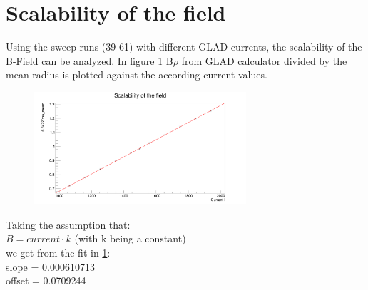 \documentclass[12pt, letterpaper]{article}
\begin{document}
\section{Scalability of the field}
Using the sweep runs (39-61) with different GLAD currents, the scalability of the B-Field can be analyzed. In figure \ref{fig:scalar} B\textunderscore$\rho$  from GLAD calculator divided by the mean radius is plotted against the according current values.\\ 
 \begin{figure}[!htb]
	\includegraphics[width=0.7\textwidth]{scalar.png}
	\caption{\label{fig:scalar}}
	\label{fig:scalar}
\end{figure}
Taking the assumption that:\\
$B = current \cdot k $ (with k being a constant)\\
we get from the fit in \ref{fig:scalar}:\\
slope = 0.000610713 \\
offset = 0.0709244\\
\end{document}
